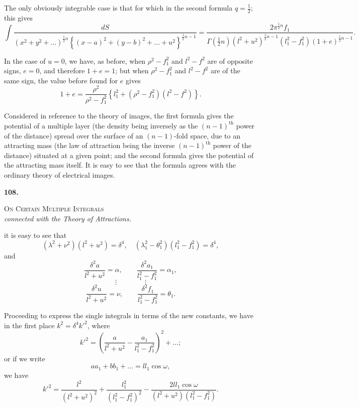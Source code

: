 \documentclass[11pt,a4paper]{book}
\begin{document}
The only obviously integrable case is that for which in the second formula $q = \frac{1}{2}$; this gives
\[\int \frac{dS}{(x^2+y^2+\ldots)^{\frac{1}{2}n} \left\{(x-a)^2 + (y-b)^2 + \ldots + u^2\right\}^{\frac{1}{2}n-1}} = \frac{2\pi^{\frac{1}{2}n}f_1}{\Gamma(\tfrac{1}{2}n)(l^2+u^2)^{\frac{1}{2}n-1}(l_1^2-f_1^2)(1+e)^{\frac{1}{2}n-1}}.\]

In the case of $u = 0$, we have, as before, when $\rho^2 - f_1^2$ and $l^2 - f^2$ are of opposite signs, $e = 0$, and therefore $1+e = 1$; but when $\rho^2 - f_1^2$ and $l^2 - f^2$ are of the same sign, the value before found for $e$ gives
\[1 + e = \frac{\rho^2}{\rho^2 - f_1^2} \left\{ l_1^2 + (\rho^2 - f_1^2)(l^2 - f^2) \right\}.\]

Considered in reference to the theory of images, the first formula gives the potential of a multiple layer (the density being inversely as the $(n-1)^{\text{th}}$ power of the distance) spread over the surface of an $(n-1)$-fold space, due to an attracting mass (the law of attraction being the inverse $(n-1)^{\text{th}}$ power of the distance) situated at a given point; and the second formula gives the potential of the attracting mass itself. It is easy to see that the formula agrees with the ordinary theory of electrical images.
\clearpage
\clearpage


\thispagestyle{empty}

\noindent\textbf{108.}\\[0.3em]
\begin{center}
\textsc{On Certain Multiple Integrals}\\[0.2em]
\textit{connected with the Theory of Attractions.}
\end{center}

it is easy to see that
\[
(\lambda^2 + \nu^2)(l^2 + u^2) = \delta^4, \quad (\lambda_1^2 - \theta_1^2)(l_1^2 - f_1^2) = \delta^4,
\]
and
\[
\frac{\delta^2 a}{l^2 + u^2} = \alpha, \qquad \frac{\delta^2 a_1}{l_1^2 - f_1^2} = \alpha_1,
\]
\[
\vdots \qquad \qquad \vdots
\]
\[
\frac{\delta^2 u}{l^2 + u^2} = \nu, \qquad \frac{\delta^2 f_1}{l_1^2 - f_1^2} = \theta_1.
\]

Proceeding to express the single integrals in terms of the new constants, we have in the first place $k^2 = \delta^4 k'^2$, where
\[
k'^2 = \left(\frac{a}{l^2+u^2} - \frac{a_1}{l_1^2-f_1^2}\right)^2 + \ldots;
\]
or if we write
\[
aa_1 + bb_1 + \ldots = ll_1 \cos \omega,
\]
we have
\[
k'^2 = \frac{l^2}{(l^2+u^2)^2} + \frac{l_1^2}{(l_1^2-f_1^2)^2} - \frac{2ll_1 \cos \omega}{(l^2+u^2)(l_1^2-f_1^2)}.
\]
\end{document}
